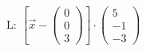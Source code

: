 \documentclass[preview]{standalone}
\begin{document}
\begin{center}
$\mathrm{L: \:} [\vec{x} - \begin{pmatrix} 0 \\ 0 \\ 3 \end{pmatrix}] \cdot \begin{pmatrix} 5 \\ -1 \\ -3 \end{pmatrix}$
\end{center}
\end{document}
